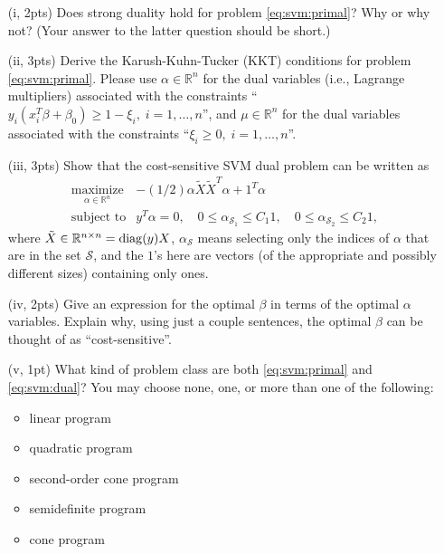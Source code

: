 \documentclass{article}
\theoremstyle{remark}
\theoremstyle{definition}
\newcommand{\maximize}{\mathop{\mathrm{maximize}}}
\newcommand{\maximizewrt}[1]{\underset{#1}{\maximize}}
\newcommand{\subjectto}{\mbox{subject to}}
\newcommand{\ones}{\mathrm 1}
\newcommand{\diag}{\mathop{\rm diag}}
\newcommand{\reals}{\mathbb R}
\begin{document}
\begin{enumerate}
\item[(i, 2pts)] Does strong duality hold for problem \eqref{eq:svm:primal}?  Why or why not?  (Your answer to the latter question should be short.)
\item[(ii, 3pts)] Derive the Karush-Kuhn-Tucker (KKT) conditions for problem \eqref{eq:svm:primal}.  Please use $\alpha \in \reals^n$ for the dual variables (i.e., Lagrange multipliers) associated with the constraints ``$y_i( x_i^T \beta + \beta_0) \geq 1 - \xi_i, \; i=1,\ldots,n$'', and $\mu \in \reals^n$ for the dual variables associated with the constraints ``$\xi_i \geq 0, \; i=1,\ldots,n$''.
\item[(iii, 3pts)] Show that the cost-sensitive SVM dual problem can be written as
\begin{equation}
\begin{array}{ll}
\maximizewrt{\alpha \in \reals^n} & -(1/2) \alpha \tilde X \tilde X^T \alpha + \ones^T \alpha \\
\subjectto & y^T \alpha = 0, \quad 0 \leq \alpha_{\mathcal{S}_1} \leq C_1 \ones, \quad 0 \leq \alpha_{\mathcal{S}_2} \leq C_2 \ones,
\end{array}
\label{eq:svm:dual}
\end{equation}
where $\tilde X \in \reals^{n \times n} = \diag(y) X$, $\alpha_{\mathcal{S}}$ means selecting only the indices of $\alpha$ that are in the set $\mathcal{S}$, and the $\ones$'s here are vectors (of the appropriate and possibly different sizes) containing only ones.
\item[(iv, 2pts)] Give an expression for the optimal $\beta$ in terms of the optimal $\alpha$ variables.  Explain why, using just a couple sentences, the optimal $\beta$ can be thought of as ``cost-sensitive''.
\item[(v, 1pt)] What kind of problem class are both \eqref{eq:svm:primal} and \eqref{eq:svm:dual}?  You may choose none, one, or more than one of the following:
\begin{itemize}
\item linear program
\item quadratic program
\item second-order cone program
\item semidefinite program
\item cone program
\end{itemize}
\end{enumerate}
\end{document}
